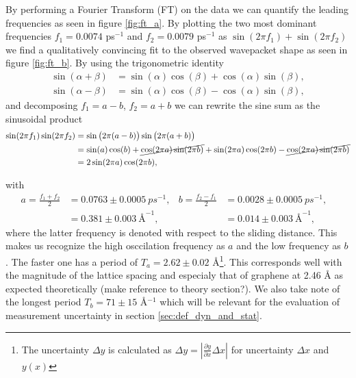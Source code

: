 By performing a Fourier Transform (FT) on the data we can quantify the leading frequencies as seen in figure \ref{fig:ft_a}. By plotting the two most dominant frequencies $f_1 = 0.0074$ ps$^{-1}$ and $f_2 = 0.0079$ ps$^{-1}$ as $\sin{(2\pi f_1)} + \sin{(2\pi f_2)}$ we find a qualitatively convincing fit to the observed wavepacket shape as seen in figure \ref{fig:ft_b}. By using the trigonometric identity
\begin{align*}
\sin (\alpha+\beta) &= \sin (\alpha) \cos (\beta) + \cos (\alpha) \sin (\beta), \\
\sin (\alpha-\beta) &= \sin (\alpha) \cos (\beta) - \cos (\alpha) \sin (\beta),
\end{align*}
and decomposing $f_1 = a - b$, $f_2 = a + b$ we can rewrite the sine sum as the sinusoidal product
\begin{align*}
  \sin(2\pi f_1) \sin(2\pi f_2) &= \sin\big(2\pi (a - b)\big) \sin\big(2\pi (a + b)\big) \\
  &= \sin(a)\cos(b) + \cancel{\cos(2\pi a)\sin(2\pi b)} + \sin(2\pi a)\cos(2\pi b) - \cancel{\cos(2\pi a)\sin(2\pi b)} \\
  &= 2 \sin(2\pi a) \cos(2\pi b),
\end{align*} 

with 
\begin{align*}
  a = \frac{f_1 + f_2}{2} &= 0.0763 \pm \SI{0.0005}{ps^{-1}},& 
  b = \frac{f_2 - f_1}{2} &= 0.0028 \pm \SI{0.0005}{ps^{-1}},& \\
  &= 0.381 \pm \SI{0.003}{{\text{Å}}^{-1}},& 
  &= 0.014 \pm \SI{0.003}{{\text{Å}}^{-1}},& 
\end{align*}
where the latter frequency is denoted with respect to the sliding distance. This makes us recognize the high osccilation frequency as $a$ and the low frequency as $b$. The faster one has a period of $T_a = 2.62 \pm 0.02$ Å\footnote{The uncertainty $\Delta y$ is calculated as $\Delta y = \left|\frac{\partial y}{\partial x} \Delta x \right|$ for uncertainty $\Delta x$ and $y(x)$}. This corresponds well with the magnitude of the lattice spacing and especialy that of graphene at 2.46 Å as expected theoretically (make reference to theory section?). We also take note of the longest period $T_b = 71 \pm 15$ Å$^{-1}$ which will be relevant for the evaluation of measurement uncertainty in section \ref{sec:def_dyn_and_stat}.

